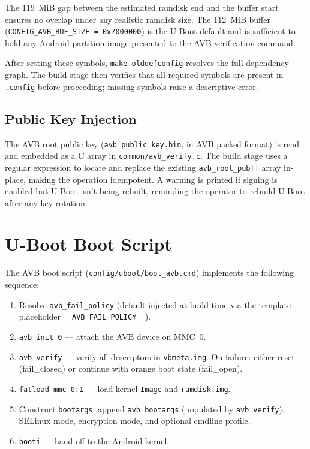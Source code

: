The 119~MiB gap between the estimated ramdisk end and the buffer start ensures no overlap under any realistic ramdisk size. The 112~MiB buffer (\texttt{CONFIG\_AVB\_BUF\_SIZE = 0x7000000}) is the U-Boot default and is sufficient to hold any Android partition image presented to the AVB verification command.

After setting these symbols, \texttt{make olddefconfig} resolves the full dependency graph. The build stage then verifies that all required symbols are present in \texttt{.config} before proceeding; missing symbols raise a descriptive error.

\subsection{Public Key Injection}

The AVB root public key (\texttt{avb\_public\_key.bin}, in AVB packed format) is read and embedded as a C array in \texttt{common/avb\_verify.c}. The build stage uses a regular expression to locate and replace the existing \texttt{avb\_root\_pub[]} array in-place, making the operation idempotent. A warning is printed if signing is enabled but U-Boot isn't being rebuilt, reminding the operator to rebuild U-Boot after any key rotation.

\section{U-Boot Boot Script}
\label{sec:impl_boot_script}

The AVB boot script (\texttt{config/uboot/boot\_avb.cmd}) implements the following sequence:

\begin{enumerate}
    \item Resolve \texttt{avb\_fail\_policy} (default injected at build time via the template placeholder \texttt{\_\_AVB\_FAIL\_POLICY\_\_}).
    \item \texttt{avb init 0} --- attach the AVB device on MMC~0.
    \item \texttt{avb verify} --- verify all descriptors in \texttt{vbmeta.img}. On failure: either reset (fail\_closed) or continue with orange boot state (fail\_open).
    \item \texttt{fatload mmc 0:1} --- load kernel \texttt{Image} and \texttt{ramdisk.img}.
    \item Construct \texttt{bootargs}: append \texttt{avb\_bootargs} (populated by \texttt{avb verify}), SELinux mode, encryption mode, and optional cmdline profile.
    \item \texttt{booti} --- hand off to the Android kernel.
\end{enumerate}

